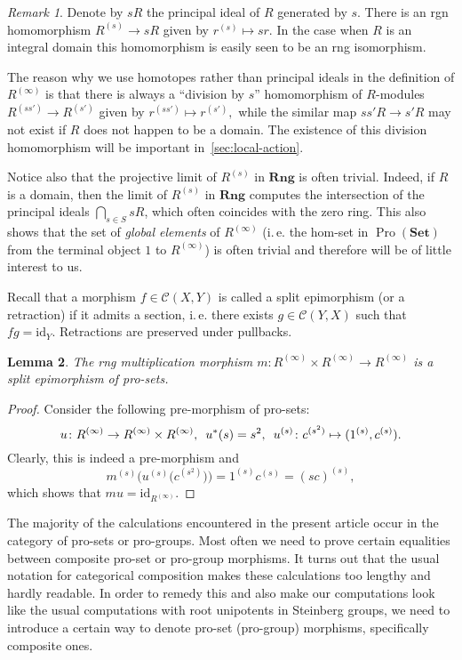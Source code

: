 \documentclass{article}
\numberwithin{equation}{section}
\newtheorem{lemma}{Lemma} \numberwithin{lemma}{section}
\theoremstyle{definition}
\theoremstyle{remark}
\newtheorem{rem}[lemma]{Remark}
\DeclareMathOperator{\Pro}{Pro}
\newcommand{\Set}{\mathbf{Set}}
\newcommand{\Rng}{\mathbf{Rng}}
\begin{document}
\begin{rem}\label{rem:prorings-comment}
 Denote by $sR$ the principal ideal of $R$ generated by $s$. 
 There is an rgn homomorphism $R^{(s)} \to sR$ given by $r^{(s)}\mapsto sr$.
 In the case when $R$ is an integral domain this homomorphism is easily seen to be an rng isomorphism.
 
 The reason why we use homotopes rather than principal ideals in the definition of $R^{(\infty)}$ is that
 there is always a ``division by $s$'' homomorphism of $R$-modules $R^{(ss')} \to R^{(s')}$ given by $r^{(ss')} \mapsto r^{(s')},$
 while the similar map $ss'R \to s'R$ may not exist if $R$ does not happen to be a domain.
 The existence of this division homomorphism will be important in~\cref{sec:local-action}.
 
 Notice also that the projective limit of $R^{(s)}$ in $\Rng$ is often trivial.
 Indeed, if $R$ is a domain, then the limit of $R^{(s)}$ in $\Rng$ computes the intersection of the principal ideals $\bigcap_{s\in S} sR$, which often coincides with the zero ring. 
 This also shows that the set of {\it global elements} of $R^{(\infty)}$ (i.\,e. the hom-set in $\Pro(\Set)$ from the terminal object $1$ to $R^{(\infty)}$) is often trivial and therefore will be of little interest to us.
\end{rem}

Recall that a morphism \(f \in \mathcal C(X, Y)\) is called a split epimorphism (or a retraction) if it admits a section,
 i.\,e. there exists $g \in \mathcal{C}(Y, X)$ such that $fg = \mathrm{id}_{Y}$. Retractions are preserved under pullbacks.

\begin{lemma}\label{RingGeneration}
The rng multiplication morphism $m \colon R^{(\infty)} \times R^{(\infty)} \to R^{(\infty)}$ is a split epimorphism of pro-sets.
\end{lemma}
\begin{proof}
Consider the following pre-morphism of pro-sets:
\[u \colon R^{(\infty)} \to R^{(\infty)} \times R^{(\infty)}, \enskip u^*(s) = s^2, \enskip u^{(s)} \colon c^{(s^2)} \mapsto (1^{(s)}, c^{(s)}).\]
Clearly, this is indeed a pre-morphism and
\[m^{(s)}\bigl(u^{(s)}\bigl(c^{(s^2)}\bigr)\bigr) = 1^{(s)} c^{(s)} = (sc)^{(s)},\]
which shows that $mu = \mathrm{id}_{R^{(\infty)}}$.
\end{proof}

The majority of the calculations encountered in the present article occur in the category of pro-sets or pro-groups.
Most often we need to prove certain equalities between composite pro-set or pro-group morphisms.
It turns out that the usual notation for categorical composition makes these calculations too lengthy and hardly readable. In order to remedy this and also make our computations look like the usual computations with root unipotents in Steinberg groups, we need to introduce a certain way to denote pro-set (pro-group) morphisms, specifically composite ones.
\end{document}
